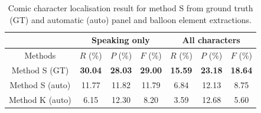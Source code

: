 

\begin{table}[ht]
  \centering
  \caption[Comic character localisation result for the sequential approach from ground truth and automatic panel and balloon element extractions]{Comic character localisation result for method S from ground truth (GT) and automatic (auto) panel and balloon element extractions.}
  \begin{tabular}{|c|c|c|c|c|c|c|}
  \hline
    & \multicolumn{3}{|c|}{Speaking only}  & \multicolumn{3}{|c|}{All characters}   \\
  \hline
  Methods  &  $ R$ (\%)  & $P$ (\%)& $F$ (\%)   &  $R$ (\%)  & $P$ (\%)   & $F$ (\%)\\
  \hline
  Method S (GT)  & \textbf{30.04} & \textbf{28.03} & \textbf{29.00} &  \textbf{15.59}    &  \textbf{23.18}   &  \textbf{18.64}   \\
  \hline
  Method S (auto)     & 11.77  & 11.82 & 11.79 & 6.84    &   12.13     &   8.75  \\
  \hline
  Method K (auto)     & 6.15  & 12.30 & 8.20 &  3.59  & 12.68 & 5.60 \\
  \hline
  \end{tabular}
      \label{tab:ex:character_localisation_result_summary}
\end{table}%


